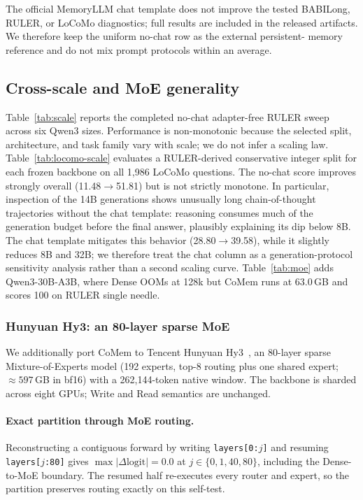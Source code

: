 The official MemoryLLM chat template does not improve the tested BABILong,
RULER, or LoCoMo diagnostics; full results are included in the released
artifacts. We therefore keep the uniform no-chat row as the external persistent-
memory reference and do not mix prompt protocols within an average.

\subsection{Cross-scale and MoE generality}
\label{app:generality}
Table~\ref{tab:scale} reports the completed no-chat adapter-free RULER sweep
across six Qwen3 sizes. Performance is non-monotonic because the selected split,
architecture, and task family vary with scale; we do not infer a scaling law.
Table~\ref{tab:locomo-scale} evaluates a RULER-derived conservative integer
split for each frozen backbone on all 1,986 LoCoMo questions. The no-chat score improves strongly overall
(11.48$\to$51.81) but is not strictly monotone. In particular, inspection of the
14B generations shows unusually long chain-of-thought trajectories without the
chat template: reasoning consumes much of the generation budget before the final
answer, plausibly explaining its dip below 8B. The chat template mitigates this
behavior (28.80$\to$39.58), while it slightly reduces 8B and 32B; we therefore
treat the chat column as a generation-protocol sensitivity analysis rather than
a second scaling curve. Table~\ref{tab:moe} adds Qwen3-30B-A3B, where Dense OOMs at 128k but
CoMem runs at 63.0\,GB and scores 100 on RULER single needle.





\subsubsection{Hunyuan Hy3: an 80-layer sparse MoE}
\label{sec:hy3-general}
We additionally port CoMem to Tencent Hunyuan Hy3~\citep{hunyuan}, an 80-layer sparse
Mixture-of-Experts model (192 experts, top-8 routing plus one shared expert;
$\approx597$\,GB in bf16) with a 262,144-token native window. The backbone is
sharded across eight GPUs; Write and Read semantics are unchanged.

\paragraph{Exact partition through MoE routing.}
Reconstructing a contiguous forward by writing \texttt{layers[0:$j$]} and
resuming \texttt{layers[$j$:80]} gives
$\max|\Delta\mathrm{logit}|=0.0$ at $j\in\{0,1,40,80\}$, including the
Dense-to-MoE boundary. The resumed half re-executes every router and expert, so
the partition preserves routing exactly on this self-test.

